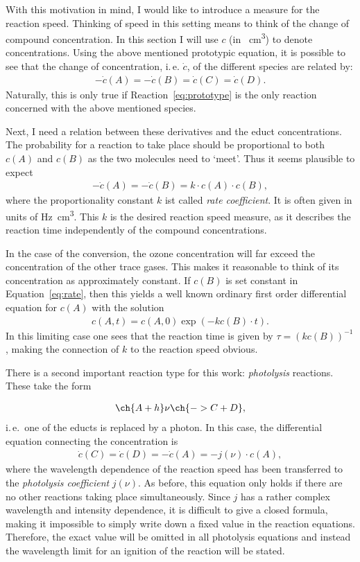 With this motivation in mind, I would like to introduce a measure for
the reaction speed. Thinking of speed in this setting means to think
of the change of compound concentration. In this section I will use
$c$ (in \si{\per\cubic\centi\meter}) to denote concentrations. Using
the above mentioned prototypic equation, it is possible to see that
the change of concentration, i.\,e. $\dot c$, of the different species
are related by:
\begin{align*}
  -\dot c(A) = - \dot c(B) = \dot c(C) = \dot c(D).
\end{align*}
Naturally, this is only true if Reaction~\eqref{eq:prototype} is the
only reaction concerned with the above mentioned species.

Next, I need a relation between these derivatives and the educt
concentrations. The probability for a reaction to take place should be
proportional to both $c(A)$ and $c(B)$ as the two molecules need to
`meet'. Thus it seems plausible to expect
\begin{align}
  -\dot c(A) = - \dot c(B) = k \cdot c(A) \cdot c(B), \label{eq:rate}
\end{align}
where the proportionality constant $k$ ist called \emph{rate
  coefficient}. It is often given in units of
\si{\hertz\cubic\centi\meter}. This $k$ is the desired reaction
speed measure, as it describes the
reaction time independently of the compound concentrations.

In the case of the conversion, the ozone concentration will far exceed
the concentration of the other trace gases. This makes it reasonable
to think of its concentration as approximately constant. If $c(B)$ is
set constant in Equation~\eqref{eq:rate}, then this yields a well
known ordinary first order differential equation for $c(A)$ with the
solution
\begin{align*}
  c(A,t) = c(A,0)\exp(-kc(B)\cdot t).
\end{align*}
In this limiting case one sees that the reaction time is given by $\tau =
(kc(B))^{-1}$, making the connection of $k$ to the reaction speed
obvious.

There is a second important reaction type for this work:
\emph{photolysis} reactions. These take the form

\begin{align}
  \ch{A + h}\nu \ch{-> C + D},
\end{align}
i.\,e.\ one of the educts is replaced by a photon. In this case, the
differential equation connecting the concentration is
\begin{align}
  \dot c(C) = \dot c(D) = -\dot c(A) = - j(\nu) \cdot c(A),
\end{align}
where the wavelength dependence of the reaction speed has been
transferred to the \emph{photolysis coefficient} $j(\nu)$. As before,
this equation only holds if there are no other reactions taking place
simultaneously. Since $j$ has a rather complex wavelength and
intensity dependence, it is difficult to give a closed formula, making
it impossible to simply write down a fixed value in the reaction
equations. Therefore, the exact value will be omitted in all photolysis
equations and instead the wavelength limit for an ignition of the
reaction will be stated.

